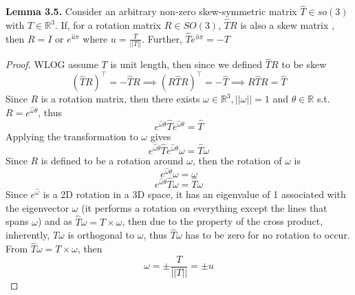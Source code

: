 \documentclass{article}
\begin{document}
\newpage
\begin{tcolorbox}[enhanced,breakable, sharp corners, colback=purple!5!white, colframe=purple!55!black, boxrule=0mm,top=0mm,bottom=0mm,leftrule=1mm, drop shadow=black!40!white]
    {\color{purple!55!black} \textbf{Lemma 3.5.}}
    Consider an arbitrary non-zero skew-symmetric matrix $\hat{T} \in so(3)$ with $T \in \mathbb{R}^3$. If, for a rotation matrix $R \in SO(3)$, $\hat{T}R$ is also a skew matrix , then $R=I$ or $e^{\hat{u}\pi}$ where $u=\frac{T}{||T||}$. Further, $\hat{T}e^{\hat{u}\pi}=-T$
\end{tcolorbox}
\begin{proof}
    WLOG assume $T$ is unit length, then since we defined $\hat{T}R$ to be skew 
        $$(\hat{T}R)^\top = -\hat{T}R \implies
        (R\hat{T}R)^\top = -\hat{T}\implies
        R\hat{T}R = \hat{T}$$
        Since $R$ is a rotation matrix, then there exists $\omega \in \mathbb{R}^3, ||\omega||=1$ and $\theta\in \mathbb{R}$ s.t. $R = e^{\hat{\omega}\theta}$, thus        $$e^{\hat{\omega}\theta}\hat{T}e^{\hat{\omega}\theta} = \hat{T}$$
        Applying the transformation to $\omega$ gives
        $$e^{\hat{\omega}\theta}\hat{T}e^{\hat{\omega}\theta}\omega = \hat{T}\omega$$
        Since $R$ is defined to be a rotation around $\omega$, then the rotation of $\omega$ is
        $$e^{\hat{\omega}\theta}\omega = \omega$$ 
        $$e^{\hat{\omega}\theta}\hat{T}\omega = \hat{T}\omega$$  
        Since $e^{\hat{\omega}}$ is a 2D rotation in a 3D space, it has an eigenvalue of 1 associated with the eigenvector $\omega$ (it performs a rotation on everything except the lines that spans $\omega$) and as $\hat{T}\omega = T\times \omega$, then due to the property of the cross product, inherently, $\hat{T}\omega$ is orthogonal to $\omega$, thus $\hat{T}\omega$ has to be zero for no rotation to occur.
        From $\hat{T}\omega = T\times \omega$, then $$\omega = \pm\frac{T}{||T||} = \pm u$$


\end{proof}
\end{document}
